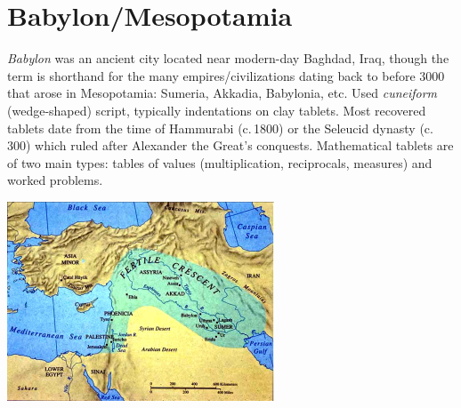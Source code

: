 \graphicspath{{2babylon/pics/}}

\section{Babylon/Mesopotamia}

\begin{minipage}[t]{0.53\linewidth}\vspace{0pt}
	\emph{Babylon} was an ancient city located near modern-day Baghdad, Iraq, though the term is shorthand for the many empires/civilizations dating back to before 3000\BC{} that arose in Mesopotamia\footnotemark{}: Sumeria, Akkadia, Babylonia, etc.
	\smallbreak
	Used \emph{cuneiform} (wedge-shaped) script, typically indentations on clay tablets.
	\smallbreak
	Most recovered tablets date from the time of Hammurabi (c.\,1800\BC) or the Seleucid dynasty (c.\,300\BC) which ruled after Alexander the Great's conquests.
	\smallbreak
	Mathematical tablets are of two main types: tables of values (multiplication, reciprocals, measures) and worked problems.
\end{minipage}
\hfill
\begin{minipage}[t]{0.46\linewidth}\vspace{0pt}
	\flushright
	\includegraphics[scale=0.7]{sumermap}
\end{minipage}




